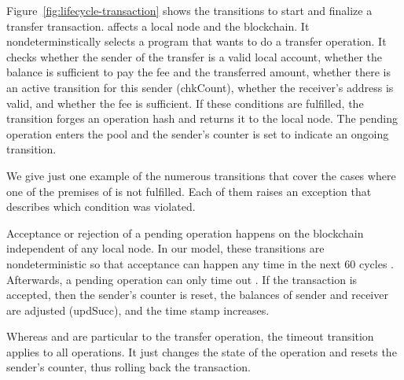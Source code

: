 \documentclass[a4paper]{llncs}
\begin{document}
Figure~\ref{fig:lifecycle-transaction} shows the transitions to start
and finalize a transfer transaction.
 affects a local node and the blockchain. It
nondeterminstically selects a program that wants to do a transfer
operation. It
checks whether the sender of the transfer is a valid local account, whether
the balance is sufficient to pay the fee and the transferred amount,
whether there is an active transition for this sender (chkCount),
whether the receiver's address is valid, and whether the fee is
sufficient. If these conditions are fulfilled, the transition forges
an operation hash and returns it to the local node. 
The pending operation enters the pool and the sender's counter is set
to indicate an ongoing transition.

We give just one example  of the numerous
transitions that cover the cases where one of the 
premises of  is not fulfilled. Each of them
raises an exception that describes which condition was violated.

Acceptance or rejection of a pending operation happens on the
blockchain independent of any local node. In our model, these
transitions are nondeterministic so that acceptance can happen any
time in the next 60 cycles . Afterwards, a
pending operation can only time out .
If the transaction is accepted, then the sender's counter is reset,
the balances of sender and receiver are adjusted (updSucc), and the
time stamp increases.

Whereas  and  are
particular to the transfer operation, the timeout transition applies
to all operations. It just changes the state of the operation and
resets the sender's counter, thus rolling back the transaction.

\end{document}
